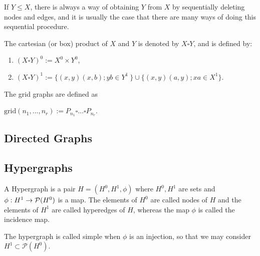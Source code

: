 If $Y \leq X$, there is always a way of obtaining $Y$ from $X$ by sequentially deleting nodes and edges, and it is usually the case that there are many ways of doing this sequential procedure.


\begin{definition}
	The cartesian (or box) product of $X$ and $Y$ is denoted by $X \square Y$, and is defined by:
	
	\begin{enumerate}
		\item $(X \square Y)^0 := X^0 \times Y^0$,
		
		\item $(X \square Y)^1 := \{(x,y)(x,b); yb  \in Y^1\ \} \cup \{(x,y)(a,y); xa \in X^1\}$.
	\end{enumerate}
\end{definition}

\begin{exmp}
	The grid graphs are defined as 
	\begin{center}
		$\text{grid}(n_1, ..., n_r) := P_{n_1}\square ... \square P_{n_r}$.
	\end{center}
\end{exmp}

\subsection{Directed Graphs}


\subsection{Hypergraphs}

\begin{definition}
	A Hypergraph is a pair $H=(H^0, H^1, \phi)$ where $H^0, H^1$ are sets and $\phi: H^1 \rightarrow \mathcal{P}(H^0)$ is a map. The elements of $H^0$ are called nodes of $H$ and the elements of $H^1$ are called hyperedges of $H$, whereas the map $\phi$ is called the incidence map.
	
	The hypergraph is called simple when $\phi$ is an injection, so that we may consider $H^1 \subset \mathcal{P}(H^0)$.
\end{definition}


